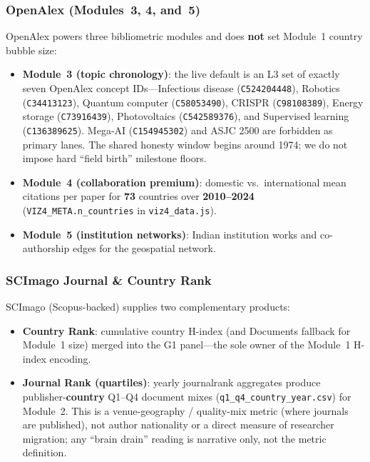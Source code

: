\subsubsection{OpenAlex (Modules~3, 4, and~5)}
OpenAlex powers three bibliometric modules and does \textbf{not} set Module~1 country bubble size:
\begin{itemize}
    \item \textbf{Module~3 (topic chronology)}: the live default is an L3 set of exactly seven OpenAlex concept IDs---Infectious disease (\texttt{C524204448}), Robotics (\texttt{C34413123}), Quantum computer (\texttt{C58053490}), CRISPR (\texttt{C98108389}), Energy storage (\texttt{C73916439}), Photovoltaics (\texttt{C542589376}), and Supervised learning (\texttt{C136389625}). Mega-AI (\texttt{C154945302}) and ASJC 2500 are forbidden as primary lanes. The shared honesty window begins around 1974; we do not impose hard ``field birth'' milestone floors.
    \item \textbf{Module~4 (collaboration premium)}: domestic vs.\ international mean citations per paper for \textbf{73} countries over \textbf{2010--2024} (\texttt{VIZ4\_META.n\_countries} in \texttt{viz4\_data.js}).
    \item \textbf{Module~5 (institution networks)}: Indian institution works and co-authorship edges for the geospatial network.
\end{itemize}

\subsubsection{SCImago Journal \& Country Rank}
SCImago (Scopus-backed) supplies two complementary products:
\begin{itemize}
    \item \textbf{Country Rank}: cumulative country H-index (and Documents fallback for Module~1 size) merged into the G1 panel---the sole owner of the Module~1 H-index encoding.
    \item \textbf{Journal Rank (quartiles)}: yearly journalrank aggregates produce publisher-\textbf{country} Q1--Q4 document mixes (\texttt{q1\_q4\_country\_year.csv}) for Module~2. This is a venue-geography / quality-mix metric (where journals are published), not author nationality or a direct measure of researcher migration; any ``brain drain'' reading is narrative only, not the metric definition.
\end{itemize}

